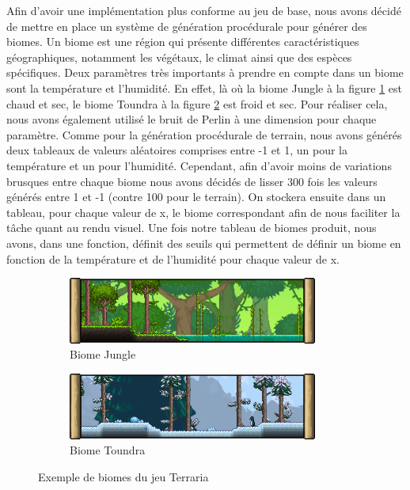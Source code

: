 \documentclass[12pt]{article}
\begin{document}
Afin d'avoir une implémentation plus conforme au jeu de base, nous avons décidé de mettre en place un système de génération procédurale pour générer des biomes.
Un biome est une région qui présente différentes caractéristiques géographiques, notamment les végétaux, le climat ainsi que des espèces spécifiques. Deux paramètres très importants à prendre en compte dans un biome sont la température et l'humidité. En effet, là où la biome Jungle à la figure \ref{jungle} est chaud et sec, le biome Toundra à la figure \ref{toundra} est froid et sec. Pour réaliser cela, nous avons également utilisé le bruit de Perlin à une dimension pour chaque paramètre. Comme pour la génération procédurale de terrain, nous avons générés deux tableaux de valeurs aléatoires comprises entre -1 et 1, un pour la température et un pour l'humidité. Cependant, afin d'avoir moins de variations brusques entre chaque biome nous avons décidés de lisser 300 fois les valeurs générés entre 1 et -1 (contre 100 pour le terrain). 
On stockera ensuite dans un tableau, pour chaque valeur de x, le biome correspondant afin de nous faciliter la tâche quant au rendu visuel. Une fois notre tableau de biomes produit, nous avons, dans une fonction, définit des seuils qui permettent de définir un biome en fonction de la température et de l'humidité pour chaque valeur de x.\par
\vspace{1cm}

\begin{figure}[!h]
  \centering
  \begin{subfigure}[b]{0.4\textwidth}
    \centering
    \includegraphics[width=0.9\textwidth]{assets/jungle.png}
    \caption{Biome Jungle}
    \label{jungle}
  \end{subfigure}
  \hspace{1cm}
  \begin{subfigure}[b]{0.4\textwidth}
    \centering
    \includegraphics[width=0.9\textwidth]{assets/toundra.png}
    \caption{Biome Toundra}
    \label{toundra}
  \end{subfigure}
  \caption{Exemple de biomes du jeu Terraria}
  \label{biomes}
\end{figure}
\newpage
\end{document}
